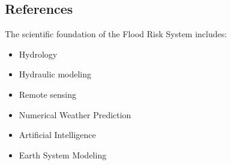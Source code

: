 
\subsection{References}

The scientific foundation of the Flood Risk System includes:

\begin{itemize}

\item Hydrology

\item Hydraulic modeling

\item Remote sensing

\item Numerical Weather Prediction

\item Artificial Intelligence

\item Earth System Modeling

\end{itemize}



